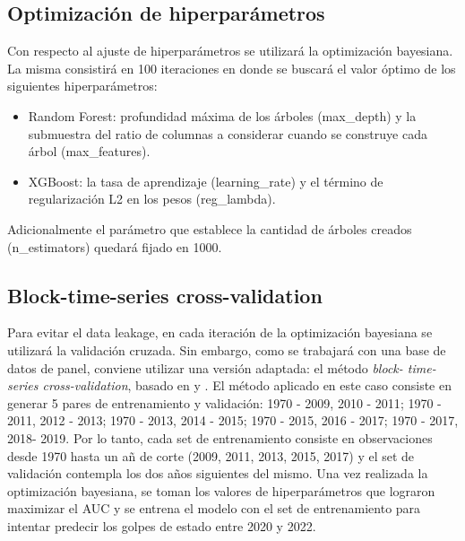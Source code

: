 \documentclass{article}
\begin{document}
\subsection{Optimización de hiperparámetros}
Con respecto al ajuste de hiperparámetros se utilizará la optimización bayesiana. La misma 
consistirá en 100 iteraciones en donde se buscará el valor óptimo de los siguientes 
hiperparámetros:

\begin{itemize}
  \item Random Forest: profundidad máxima de los árboles (max\_depth) y la 
  submuestra del ratio de columnas a considerar cuando se construye cada árbol 
  (max\_features).
  \item XGBoost: la tasa de aprendizaje (learning\_rate) y el término de 
  regularización L2 en los pesos (reg\_lambda).
\end{itemize}

Adicionalmente el parámetro que establece la cantidad de árboles creados 
(n\_estimators) quedará fijado en 1000.

\subsection{Block-time-series cross-validation}
Para evitar el data leakage, en cada iteración de la optimización bayesiana
se utilizará la validación cruzada. Sin embargo, como se trabajará con una base
de datos de panel, conviene utilizar una versión adaptada: el método \textit{block-
time-series cross-validation}, basado en \cite{Bur94} y \cite{RAc00}. El método 
aplicado en este caso consiste en generar 5 pares de entrenamiento y validación: 
{1970 - 2009, 2010 - 2011}; {1970 - 2011, 2012 - 2013}; {1970 - 2013, 2014 - 2015}; 
{1970 - 2015, 2016 - 2017}; {1970 - 2017, 2018- 2019}. Por lo tanto, cada set de 
entrenamiento consiste en observaciones desde 1970 hasta un añ de corte (2009, 
2011, 2013, 2015, 2017) y el set de validación contempla los dos años siguientes 
del mismo. Una vez realizada la optimización bayesiana, se toman los valores de 
hiperparámetros que lograron maximizar el AUC y se entrena el modelo con el set de 
entrenamiento para intentar predecir los golpes de estado entre 2020 y 2022. 
\end{document}
